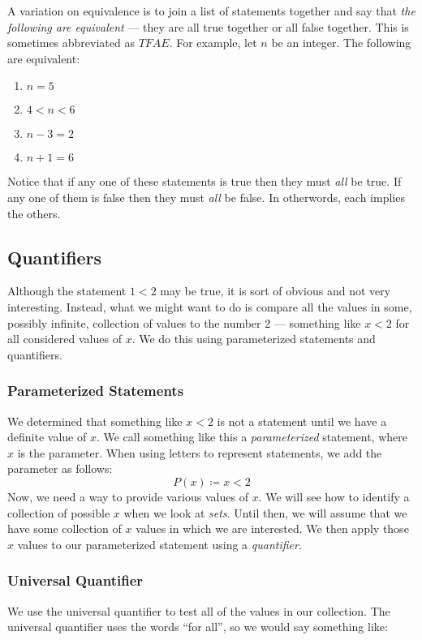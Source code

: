 \documentclass[letterpaper,12pt,fleqn]{article}
\begin{document}
A variation on equivalence is to join a list of statements together and say
that \emph{the following are equivalent} --- they are all true together or
all false together. This is sometimes abbreviated as $TFAE$. For example,
let $n$ be an integer. The following are equivalent:
\begin{enumerate}
\item{$n=5$}
\item{$4<n<6$}
\item{$n-3=2$}
\item{$n+1=6$}
\end{enumerate}
Notice that if any one of these statements is true then they must \emph{all}
be true. If any one of them is false then they must \emph{all} be false. In
otherwords, each implies the others.

\subsection*{Quantifiers}

Although the statement $1<2$ may be true, it is sort of obvious and not very
interesting. Instead, what we might want to do is compare all the values in
some, possibly infinite, collection of values to the number 2 --- something
like $x<2$ for all considered values of $x$. We do this using parameterized
statements and quantifiers.

\subsubsection*{Parameterized Statements}

We determined that something like $x<2$ is not a statement until we have a
definite value of $x$. We call something like this a \emph{parameterized}
statement, where $x$ is the parameter. When using letters to represent
statements, we add the parameter as follows:
\[P(x)\coloneqq x<2\]
Now, we need a way to provide various values of $x$. We will see how to
identify a collection of possible $x$ when we look at \emph{sets}. Until then,
we will assume that we have some collection of $x$ values in which we are
interested. We then apply those $x$ values to our parameterized statement using
a \emph{quantifier}.

\subsubsection*{Universal Quantifier}

We use the universal quantifier to test all of the values in our collection.
The universal quantifier uses the words ``for all'', so we would say something
like:
\end{document}
